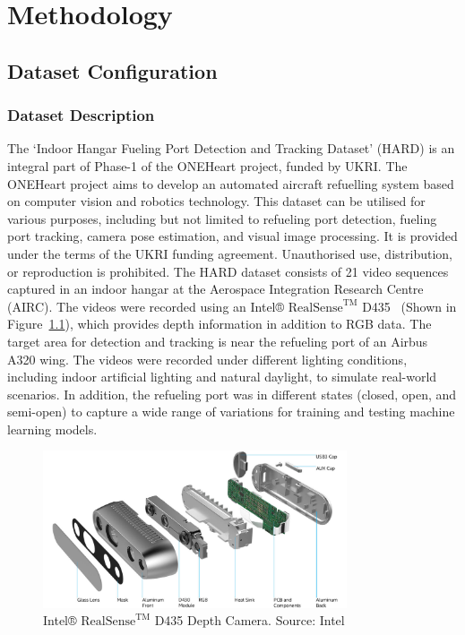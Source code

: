 \documentclass[12pt,oneside]{book} %
\begin{document}
\chapter{Methodology}\label{chap:methodology}
\section{Dataset Configuration}
\subsection{Dataset Description}
The `Indoor Hangar Fueling Port Detection and Tracking Dataset' (HARD) is an
integral part of Phase-1 of the ONEHeart project, funded by UKRI. The ONEHeart
project aims to develop an automated aircraft refuelling system based on
computer vision and robotics technology. This dataset can be utilised for
various purposes, including but not limited to refueling port detection,
fueling port tracking, camera pose estimation, and visual image processing. It
is provided under the terms of the UKRI funding agreement. Unauthorised use,
distribution, or reproduction is prohibited. The HARD dataset consists of 21
video sequences captured in an indoor hangar at the Aerospace Integration
Research Centre (AIRC). The videos were recorded using an Intel®
${\text{RealSense}}^{\text{TM}}$ D435~\cite{IntelRealSense} (Shown in
Figure~\ref{fig:intel-realsense-d435}), which provides depth information in
addition to RGB data. The target area for detection and tracking is near the
refueling port of an Airbus A320 wing. The videos were recorded under different
lighting conditions, including indoor artificial lighting and natural daylight,
to simulate real-world scenarios. In addition, the refueling port was in
different states (closed, open, and semi-open) to capture a wide range of
variations for training and testing machine learning models.

\begin{figure}[H]
    \centering
    \includegraphics[width=0.8\textwidth]{figures/depth-camera-d435_details.jpg}
    \caption{Intel® ${\text{RealSense}}^{\text{TM}}$ D435 Depth Camera. Source: Intel}\label{fig:intel-realsense-d435}
\end{figure}
\end{document}
